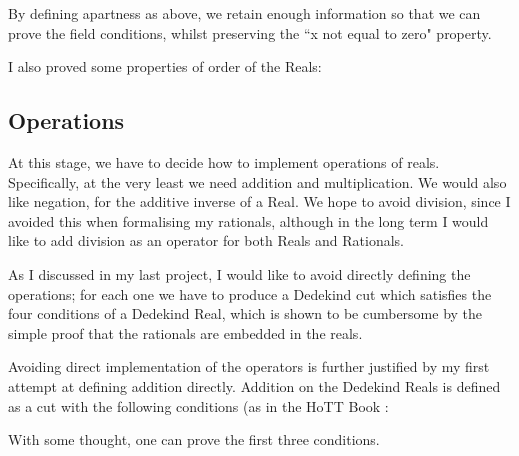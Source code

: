\documentclass[ProjectReport]{subfiles}
\begin{document}
By defining apartness as above, we retain enough information so that we can prove the field conditions, whilst preserving the ``x not equal to zero" property.

I also proved some properties of order of the Reals:



\subsection{Operations}

At this stage, we have to decide how to implement operations of reals. Specifically, at the very least we need addition and multiplication. We would also like negation, for the additive inverse of a Real. We hope to avoid division, since I avoided this when formalising my rationals, although in the long term I would like to add division as an operator for both Reals and Rationals.


As I discussed in my last project, I would like to avoid directly defining the operations; for each one we have to produce a Dedekind cut which satisfies the four conditions of a Dedekind Real, which is shown to be cumbersome by the simple proof that the rationals are embedded in the reals. 

Avoiding direct implementation of the operators is further justified by my first attempt at defining addition directly. Addition on the Dedekind Reals is defined as a cut with the following conditions (as in the HoTT Book \cite{hottbook}:


With some thought, one can prove the first three conditions. 
\end{document}

